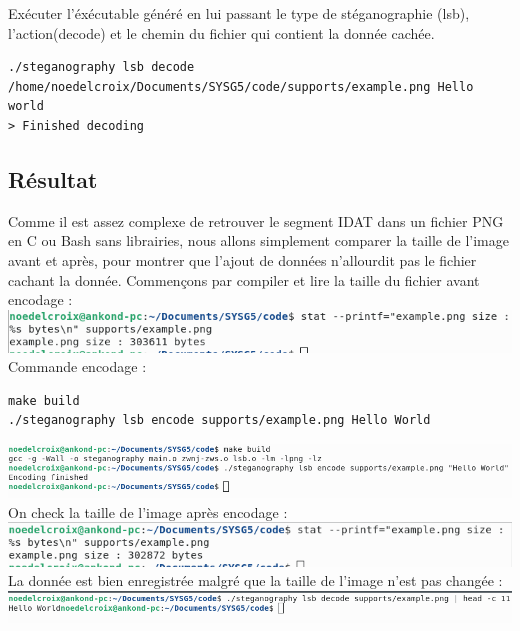 Exécuter l'éxécutable généré en lui passant le type de stéganographie (lsb), l'action(decode) et le chemin du fichier qui contient la donnée cachée.
\begin{lstlisting}
./steganography lsb decode /home/noedelcroix/Documents/SYSG5/code/supports/example.png Hello world
> Finished decoding
\end{lstlisting}
\subsection{Résultat}
Comme il est assez complexe de retrouver le segment IDAT dans un fichier PNG en C ou Bash sans librairies, nous allons simplement comparer la taille de l'image avant et après, pour montrer que l'ajout de données n'allourdit pas le fichier cachant la donnée.
\newline
Commençons par compiler et lire la taille du fichier avant encodage :
\newline
\includegraphics[width=1\textwidth]{img/lsb_size_before.png} 
Commande encodage :
\begin{lstlisting}
make build
./steganography lsb encode supports/example.png Hello World
\end{lstlisting}
\includegraphics[width=1\textwidth]{img/lsb_encode.png} 
On check la taille de l'image après encodage :
\newline
\includegraphics[width=1\textwidth]{img/lsb_size_after.png}
La donnée est bien enregistrée malgré que la taille de l'image n'est pas changée :
\newline
\includegraphics[width=1\textwidth]{img/lsb_decode.png}

